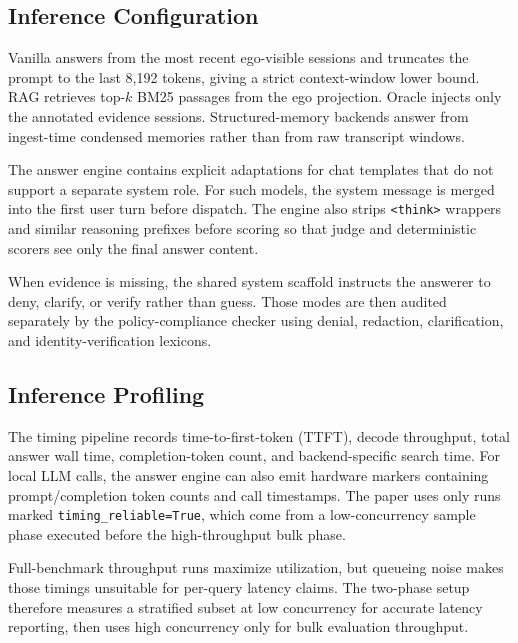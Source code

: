 \subsection{Inference Configuration}
\label{app:inference}

Vanilla answers from the most recent ego-visible sessions and truncates the prompt to the last 8{,}192 tokens, giving a strict context-window lower bound.
RAG retrieves top-$k$ BM25 passages from the ego projection.
Oracle injects only the annotated evidence sessions.
Structured-memory backends answer from ingest-time condensed memories rather than from raw transcript windows.

The answer engine contains explicit adaptations for chat templates that do not support a separate system role.
For such models, the system message is merged into the first user turn before dispatch.
The engine also strips \texttt{<think>} wrappers and similar reasoning prefixes before scoring so that judge and deterministic scorers see only the final answer content.

When evidence is missing, the shared system scaffold instructs the answerer to deny, clarify, or verify rather than guess.
Those modes are then audited separately by the policy-compliance checker using denial, redaction, clarification, and identity-verification lexicons.

\subsection{Inference Profiling}
\label{app:inference-profiling}

The timing pipeline records time-to-first-token (TTFT), decode throughput, total answer wall time, completion-token count, and backend-specific search time.
For local LLM calls, the answer engine can also emit hardware markers containing prompt/completion token counts and call timestamps.
The paper uses only runs marked \texttt{timing\_reliable=True}, which come from a low-concurrency sample phase executed before the high-throughput bulk phase.

Full-benchmark throughput runs maximize utilization, but queueing noise makes those timings unsuitable for per-query latency claims.
The two-phase setup therefore measures a stratified subset at low concurrency for accurate latency reporting, then uses high concurrency only for bulk evaluation throughput.

